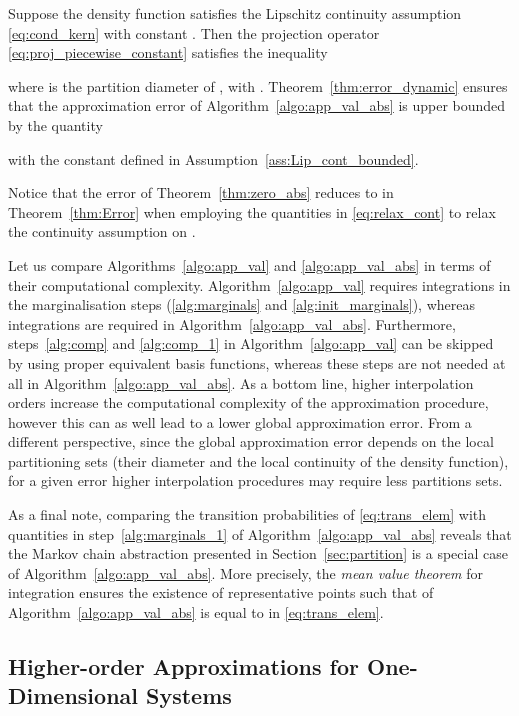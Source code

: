 \documentclass{LMCS}
\begin{document}
\begin{thm}
\label{thm:zero_abs} 
Suppose the density function  satisfies the Lipschitz continuity assumption \eqref{eq:cond_kern} with constant . Then the projection operator \eqref{eq:proj_piecewise_constant} satisfies the inequality 

where  is the partition diameter of ,
with .
Theorem~\ref{thm:error_dynamic} ensures that the approximation error of Algorithm~\ref{algo:app_val_abs} is upper bounded by the quantity

with the constant  defined in Assumption~\ref{ass:Lip_cont_bounded}. 
\end{thm}
Notice that the error  of Theorem~\ref{thm:zero_abs} reduces to  in Theorem~\ref{thm:Error} when employing the quantities in \eqref{eq:relax_cont} to relax the continuity assumption on . 

Let us compare Algorithms~\ref{algo:app_val} and \ref{algo:app_val_abs} in terms of their computational complexity. 
Algorithm~\ref{algo:app_val} requires  integrations in the marginalisation steps (\ref{alg:marginals} and \ref{alg:init_marginals}),
whereas  integrations are required in Algorithm~\ref{algo:app_val_abs}.  
Furthermore, steps~\ref{alg:comp} and \ref{alg:comp_1} in Algorithm~\ref{algo:app_val} can be skipped by using proper equivalent basis functions, 
whereas these steps are not needed at all in Algorithm~\ref{algo:app_val_abs}. 
As a bottom line, 
higher interpolation orders increase the computational complexity of the approximation procedure, 
however this can as well lead to a lower global approximation error.   
From a different perspective, since the global approximation error depends on the local partitioning sets (their diameter and the local continuity of the density function), 
for a given error higher interpolation procedures may require less partitions sets.

As a final note, comparing the transition probabilities of \eqref{eq:trans_elem} with quantities  in step~\ref{alg:marginals_1} of Algorithm~\ref{algo:app_val_abs} reveals that the Markov chain abstraction presented in Section~\ref{sec:partition} is a special case of Algorithm~\ref{algo:app_val_abs}.
More precisely, the \emph{mean value theorem} for integration ensures the existence of representative points  such that   of Algorithm~\ref{algo:app_val_abs} is equal to  in \eqref{eq:trans_elem}.

\subsection{Higher-order Approximations for One-Dimensional Systems}
\end{document}
